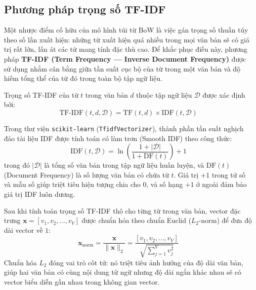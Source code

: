 \subsection{Phương pháp trọng số TF-IDF}
Một nhược điểm cố hữu của mô hình túi từ BoW là việc gán trọng số thuần túy theo số lần xuất hiện: những từ xuất hiện quá nhiều trong mọi văn bản sẽ có giá trị rất lớn, lấn át các từ mang tính đặc thù cao. Để khắc phục điều này, phương pháp \textbf{TF-IDF (Term Frequency --- Inverse Document Frequency)} được sử dụng nhằm cân bằng giữa tần suất cục bộ của từ trong một văn bản và độ hiếm tổng thể của từ đó trong toàn bộ tập ngữ liệu.

Trọng số TF-IDF của từ $t$ trong văn bản $d$ thuộc tập ngữ liệu $\mathcal{D}$ được xác định bởi:
\begin{equation}
\text{TF-IDF}(t, d, \mathcal{D}) = \text{TF}(t, d) \times \text{IDF}(t, \mathcal{D})
\end{equation}

Trong thư viện \texttt{scikit-learn} (\texttt{TfidfVectorizer}), thành phần tần suất nghịch đảo tài liệu IDF được tính toán có làm trơn (Smooth IDF) theo công thức:
\begin{equation}
\text{IDF}(t, \mathcal{D}) = \ln \left( \frac{1 + |\mathcal{D}|}{1 + \text{DF}(t)} \right) + 1
\end{equation}
trong đó $|\mathcal{D}|$ là tổng số văn bản trong tập ngữ liệu huấn luyện, và $\text{DF}(t)$ (Document Frequency) là số lượng văn bản có chứa từ $t$. Giá trị $+1$ trong tử số và mẫu số giúp triệt tiêu hiện tượng chia cho 0, và số hạng $+1$ ở ngoài đảm bảo giá trị IDF luôn dương.

Sau khi tính toán trọng số TF-IDF thô cho từng từ trong văn bản, vector đặc trưng $\mathbf{x} = [v_1, v_2, \dots, v_V]$ được chuẩn hóa theo chuẩn Euclid ($L_2$-norm) để đưa độ dài vector về $1$:
\begin{equation}
\mathbf{x}_{\text{norm}} = \frac{\mathbf{x}}{\|\mathbf{x}\|_2} = \frac{[v_1, v_2, \dots, v_V]}{\sqrt{\sum_{j=1}^V v_j^2}}
\end{equation}
Chuẩn hóa $L_2$ đóng vai trò cốt tử: nó triệt tiêu ảnh hưởng của độ dài văn bản, giúp hai văn bản có cùng nội dung từ ngữ nhưng độ dài ngắn khác nhau sẽ có vector biểu diễn gần nhau trong không gian vector.

